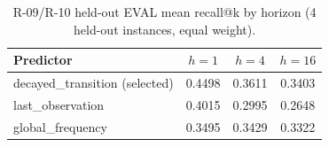 \begin{table}[t]
\centering
\caption{R-09/R-10 held-out EVAL mean recall@k by horizon (4 held-out instances, equal weight).}
\label{tab:c2-predictor}
\small
\begin{tabular}{@{}lccc@{}}
\toprule
Predictor & $h{=}1$ & $h{=}4$ & $h{=}16$ \\
\midrule
decayed\_transition (selected) & 0.4498 & 0.3611 & 0.3403 \\
last\_observation & 0.4015 & 0.2995 & 0.2648 \\
global\_frequency & 0.3495 & 0.3429 & 0.3322 \\
\bottomrule
\end{tabular}
\end{table}
